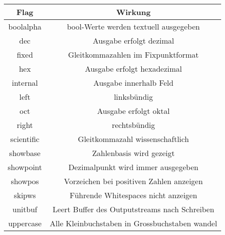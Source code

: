 \begin{center}
    \begin{tabular}{cc}
        \rowcolor[HTML]{EFEFEF} 
        \textbf{Flag} & \textbf{Wirkung}                                        \\ \hline
        boolalpha     & bool-Werte werden textuell ausgegeben                   \\
        dec           & Ausgabe erfolgt dezimal                                 \\
        fixed         & Gleitkommazahlen im Fixpunktformat                      \\
        hex           & Ausgabe erfolgt hexadezimal                             \\
        internal      & Ausgabe innerhalb Feld                                  \\
        left          & linksbündig                                             \\
        oct           & Ausgabe erfolgt oktal                                   \\
        right         & rechtsbündig                                            \\
        scientific    & Gleitkommazahl wissenschaftlich                         \\
        showbase      & Zahlenbasis wird gezeigt                                \\
        showpoint     & Dezimalpunkt wird immer ausgegeben                      \\
        showpos       & Vorzeichen bei positiven Zahlen anzeigen                \\
        skipws        & Führende Whitespaces nicht anzeigen                     \\
        unitbuf       & Leert Buffer des Outputstreams nach Schreiben           \\
        uppercase     & Alle Kleinbuchstaben in Grossbuchstaben wandel         
    \end{tabular}
\end{center}



